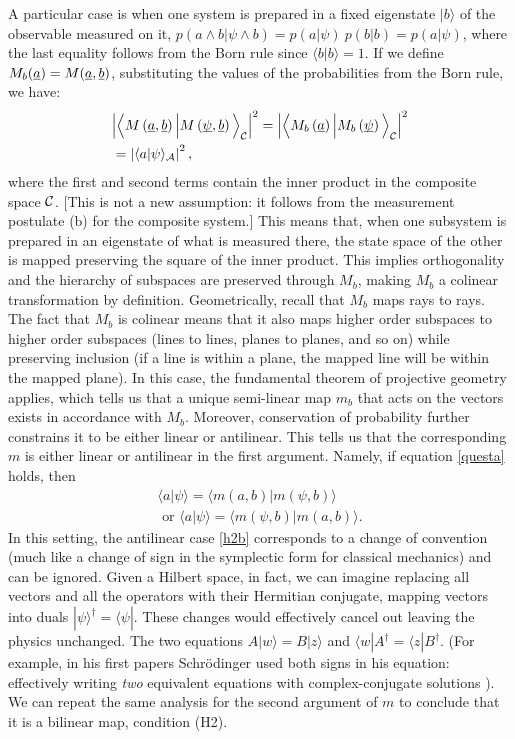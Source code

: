 \documentclass[aps,prl,amsmath,amssymb,twocolumn]{revtex4}
\theoremstyle{plain}
\theoremstyle{definition}
\theoremstyle{remark}
\newcommand{\pj}[1] {\underbar{$#1$}}
\def\>{\rangle}
\def\<{\langle}
\def\labell#1{\label{#1}}
\begin{document}
	A particular case is when one system is
	prepared in a fixed eigenstate $|b\>$ of the observable measured on it,
	$p(a\wedge b|\psi\wedge b)=p(a|\psi)\:p(b|b)=p(a|\psi)$, where the last equality follows from the Born rule since $\<b|b\>=1$. 
	If we define $M_b(\pj{a}) = M(\pj{a},\pj{b})$, substituting the values of the
	probabilities from the Born rule, we have:
	\begin{align} &\Big|\Big\<M\left(\pj{a},\pj{b}\right)\Big|M\left(\pj{\psi},\pj{b}\right)\Big\>_{\cal C}\Big|^2
	=\Big|\Big\<M_b\left(\pj{a}\right)\Big|M_b\left(\pj{\psi}\right)\Big\>_{\cal C}\Big|^2
	\nonumber \\&
	=\left|\<a|\psi\>_{\cal A}\right|^2
	\labell{questa},
	\end{align}
	where the first and second terms contain the inner product in the composite
	space $\cal C$. [This is not a new assumption: it follows from the
	measurement postulate (b) for the composite system.] This means that,
	when one subsystem is prepared in an eigenstate of what is measured
	there, the state space of the other is mapped preserving the square of
	the inner product.
	This implies orthogonality and
	the hierarchy of subspaces are preserved through $M_b$, making $M_b$ a
	colinear transformation by definition. Geometrically, recall that $M_b$ maps rays to rays. The fact that $M_b$ is colinear means that it also maps higher order subspaces to higher order subspaces (lines to lines, planes to planes, and so on) while preserving inclusion (if a line is within a plane, the mapped line will be within the mapped plane). In this case, the fundamental
	theorem of projective geometry \cite{fun} applies, which tells us that
	a unique semi-linear map $m_b$ that acts on the vectors exists in accordance with $M_b$.
	Moreover, conservation of probability further constrains it to be
	either linear or antilinear. This tells us that the corresponding $m$
	is either linear or antilinear in the first argument. Namely, if equation
	\eqref{questa} holds, then
	\begin{align}
	\<a|\psi\>=\<m(a,b)|m(\psi,b)\>\labell{h2}\;
	\\\mbox{ or }
	\<a|\psi\>=\<m(\psi,b)|m(a,b)\> \labell{h2b}.
	\end{align}
	In this setting, the antilinear case \eqref{h2b} corresponds to a change of convention (much like a change of sign in the symplectic form for classical mechanics) and can be ignored. Given a Hilbert space, in fact, we can imagine replacing all vectors and all the operators with their Hermitian conjugate, mapping vectors into duals $|\psi\>^\dag=\<\psi|$. These changes would effectively cancel out leaving the physics unchanged. The two equations $A|w\>=B|z\>$ and $\<w|A^\dag=\<z|B^\dag$.  (For example, in his first papers
	Schr\"odinger used both signs in his equation: effectively writing
	{\em two} equivalent equations with complex-conjugate solutions
	\cite{sch}). We can repeat the same analysis for the second
	argument of $m$ to conclude that it is a bilinear map, condition (H2).
	
\end{document}
